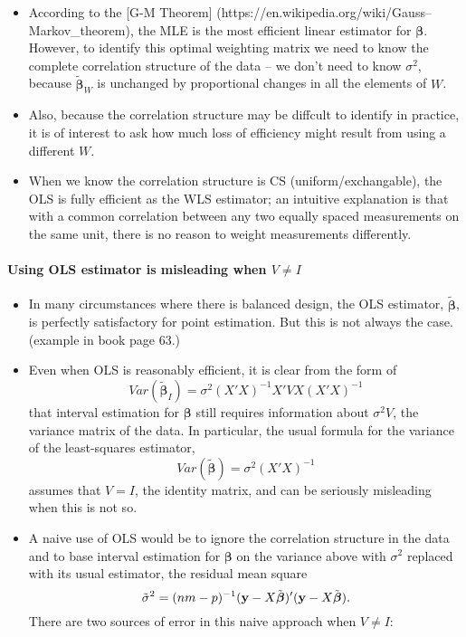 \documentclass[]{article}
\begin{document}
\begin{itemize}
\item
  According to the {[}G-M Theorem{]}
  (https://en.wikipedia.org/wiki/Gauss--Markov\_theorem), the MLE is the
  most efficient linear estimator for $\boldsymbol{\beta}$. However, to
  identify this optimal weighting matrix we need to know the complete
  correlation structure of the data -- we don't need to know $\sigma^2$,
  because $\tilde{\boldsymbol{\beta}}_W$ is unchanged by proportional
  changes in all the elements of $W$.
\item
  Also, because the correlation structure may be diffcult to identify in
  practice, it is of interest to ask how much loss of efficiency might
  result from using a different $W$.
\item
  When we know the correlation structure is CS (uniform/exchangable),
  the OLS is fully efficient as the WLS estimator; an intuitive
  explanation is that with a common correlation between any two equally
  spaced measurements on the same unit, there is no reason to weight
  measurements differently.
\end{itemize}

\paragraph{Using OLS estimator is misleading when
$V\ne I$}\label{using-ols-estimator-is-misleading-when-vne-i}

\begin{itemize}
\item
  In many circumstances where there is balanced design, the OLS
  estimator, $\tilde{\boldsymbol{\beta}}$, is perfectly satisfactory for
  point estimation. But this is not always the case. (example in book
  page 63.)
\item
  Even when OLS is reasonably efficient, it is clear from the form of
  \[Var(\tilde{\boldsymbol{\beta}}_I)=\sigma^2(X'X)^{-1}X'VX(X'X)^{-1}\]
  that interval estimation for $\boldsymbol{\beta}$ still requires
  information about $\sigma^2V$, the variance matrix of the data. In
  particular, the usual formula for the variance of the least-squares
  estimator, \[Var(\tilde{\boldsymbol{\beta}})=\sigma^2(X'X)^{-1}\]
  assumes that $V=I$, the identity matrix, and can be seriously
  misleading when this is not so.
\item
  A naive use of OLS would be to ignore the correlation structure in the
  data and to base interval estimation for $\boldsymbol{\beta}$ on the
  variance above with $\sigma^2$ replaced with its usual estimator, the
  residual mean square
  \[\tilde{\sigma}^2=(nm-p)^{-1}({\bf y}-X\tilde{\boldsymbol{\beta}})'({\bf y}-X\tilde{\boldsymbol{\beta}}).\]
  There are two sources of error in this naive approach when $V\ne I$:
\end{itemize}
\end{document}
